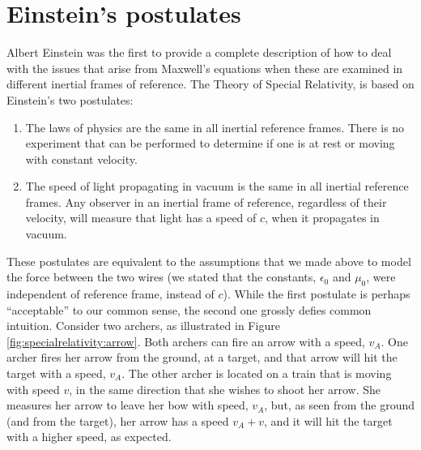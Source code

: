 \section{Einstein's postulates}
Albert Einstein was the first to provide a complete description of how to deal with the issues that arise from Maxwell's equations when these are examined in different inertial frames of reference. The Theory of Special Relativity, is based on Einstein's two postulates:
\begin{enumerate}
\item The laws of physics are the same in all inertial reference frames. There is no experiment that can be performed to determine if one is at rest or moving with constant velocity.
\item The speed of light propagating in vacuum is the same in all inertial reference frames. Any observer in an inertial frame of reference, regardless of their velocity, will measure that light has a speed of $c$, when it propagates in vacuum. 
\end{enumerate}
These postulates are equivalent to the assumptions that we made above to model the force between the two wires (we stated that the constants, $\epsilon_0$ and $\mu_0$, were independent of reference frame, instead of $c$). While the first postulate is perhaps ``acceptable'' to our common sense, the second one grossly defies common intuition. Consider two archers, as illustrated in Figure \ref{fig:specialrelativity:arrow}.
Both archers can fire an arrow with a speed, $v_A$. One archer fires her arrow from the ground, at a target, and that arrow will hit the target with a speed, $v_A$. The other archer is located on a train that is moving with speed $v$, in the same direction that she wishes to shoot her arrow. She measures her arrow to leave her bow with speed, $v_A$, but, as seen from the ground (and from the target), her arrow has a speed $v_A+v$, and it will hit the target with a higher speed, as expected.

